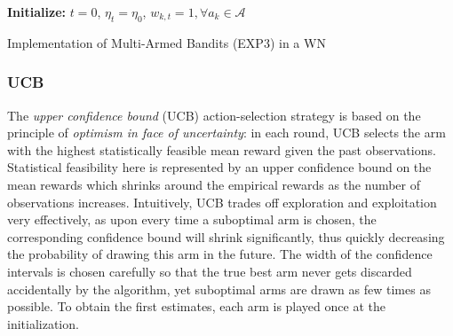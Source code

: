 \documentclass{article}
\begin{document}
	\begin{algorithm}[H]	
		\SetAlgoLined
		\textbf{Initialize:} $t=0$, $\eta_t = \eta_0$, $w_{k,t} = 1, \forall a_k \in \mathcal{A}$\\
		\caption{Implementation of Multi-Armed Bandits (EXP3) in a WN}
		\label{alg:exp3}	
	\end{algorithm}
	
	\subsubsection{UCB}
	\label{section:bandits_ucb}		
	The \emph{upper confidence bound} (UCB) action-selection strategy \cite{Agr95,BuKa96,auer2002finite} is based on the principle of \emph{optimism in face of uncertainty}: in each round, UCB selects the arm with the highest statistically feasible mean reward given the past observations. Statistical feasibility here is represented by an upper confidence bound on the mean rewards which shrinks around the empirical rewards as the number of observations increases. Intuitively, UCB trades off exploration and exploitation very effectively, as upon every time a suboptimal arm is chosen, the corresponding confidence bound will shrink significantly, thus quickly decreasing the probability of drawing this arm in the future. The width of the confidence intervals is chosen carefully so that the true best arm never gets discarded accidentally by the algorithm, yet suboptimal arms are drawn as few times as possible. To obtain the first estimates, each arm is played once at the initialization. 
	
\end{document}
